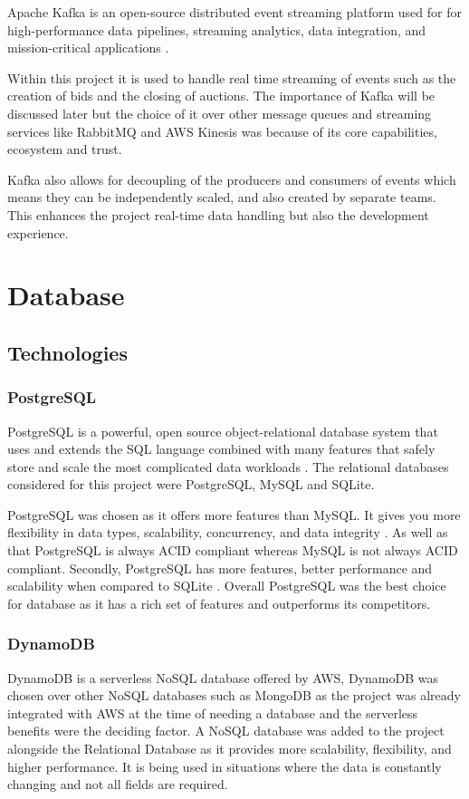 \documentclass[]{project_report}
\begin{document}
Apache Kafka is an open-source distributed event streaming platform \cite{kafka} used for for high-performance data pipelines, streaming analytics, data integration, and mission-critical applications \cite{kafka}. 

Within this project it is used to handle real time streaming of events such as the creation of bids and the closing of auctions. The importance of Kafka will be discussed later but the choice of it over other message queues and streaming services like RabbitMQ and AWS Kinesis was because of its core capabilities, ecosystem and trust.

Kafka also allows for decoupling of the producers and consumers of events which means they can be independently scaled, and also created by separate teams. This enhances the project real-time data handling but also the development experience. 

\section{Database}
\subsection{Technologies}
\subsubsection{PostgreSQL}

PostgreSQL is a powerful, open source object-relational database system that uses and extends the SQL language combined with many features that safely store and scale the most complicated data workloads \cite{postgresql}. The relational databases considered for this project were PostgreSQL, MySQL and SQLite. 

PostgreSQL was chosen as it offers more features than MySQL. It gives you more flexibility in data types, scalability, concurrency, and data integrity \cite{mysql_vs_postgres}. As well as that PostgreSQL is always ACID compliant \cite{mysql_vs_postgres} whereas MySQL is not always ACID compliant. Secondly, PostgreSQL has more features, better performance and scalability when compared to SQLite \cite{sqlite_vs_postgres}. Overall PostgreSQL was the best choice for database as it has a rich set of features and outperforms its competitors.

\subsubsection{DynamoDB}
\label{subsubsec:database:technology:dynamo}
DynamoDB is a serverless NoSQL database offered by AWS, DynamoDB was chosen over other NoSQL databases such as MongoDB as the project was already integrated with AWS at the time of needing a database and the serverless benefits were the deciding factor. A NoSQL database was added to the project alongside the Relational Database as it provides more scalability, flexibility, and higher performance. It is being used in situations where the data is constantly changing and not all fields are required.
\end{document}
